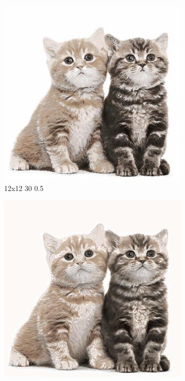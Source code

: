 \documentclass[12pt,a4paper]{article}
\begin{document}
\begin{figure}[htb]
\medskip
\begin{subfigure}{0.25\textwidth}
  \includegraphics[width=\linewidth]{images/big/12-12-30-05}
  \caption{12x12 30 0.5}
  \label{fig:6}
\end{subfigure}
\begin{subfigure}{0.25\textwidth}
  \includegraphics[width=\linewidth]{images/big/16-16-30-05}

\end{subfigure}
\end{figure}
\end{document}
